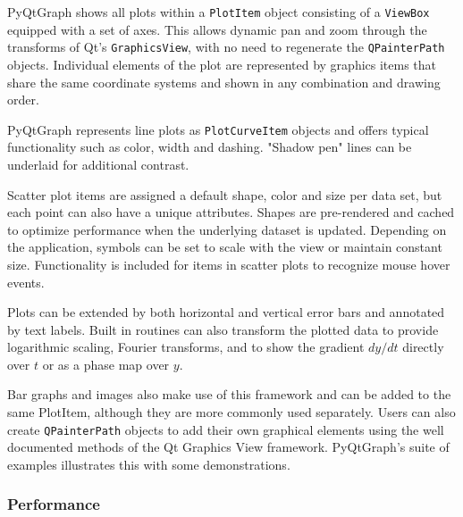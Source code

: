 \documentclass[journal]{vgtc}                %
\begin{document}
PyQtGraph shows all plots within a \texttt{PlotItem} object consisting of a \texttt{ViewBox} equipped with a set of axes. This allows dynamic pan and zoom through the transforms of Qt's \texttt{GraphicsView}, with no need to regenerate the \texttt{QPainterPath} objects. Individual elements of the plot are represented by graphics items that share the same coordinate systems and shown in any combination and drawing order. 

PyQtGraph represents line plots as \texttt{PlotCurveItem} objects and offers typical functionality such as color, width and dashing. "Shadow pen" lines can be underlaid for additional contrast. 

Scatter plot items are assigned a default shape, color and size per data set, but each point can also have a unique attributes. Shapes are pre-rendered and cached to optimize performance when the underlying dataset is updated. Depending on the application, symbols can be set to scale with the view or maintain constant size.  Functionality is included for items in scatter plots to recognize mouse hover events.

Plots can be extended by both horizontal and vertical error bars and annotated by text labels. Built in routines can also transform the plotted data to provide logarithmic scaling, Fourier transforms, and to show the gradient $dy/dt$ directly over $t$ or as a phase map over $y$.

Bar graphs and images also make use of this framework and can be added to the same PlotItem, although they are more commonly used separately. Users can also create \texttt{QPainterPath} objects to add their own graphical elements using the well documented methods of the Qt Graphics View framework. PyQtGraph's suite of examples\cite{pg_examples} illustrates this with some demonstrations.

\color{brown}
\subsubsection{Performance}
\end{document}
